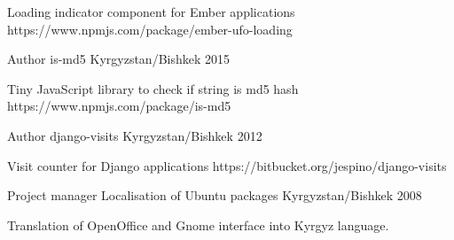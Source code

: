 \begin{cventries}
{\begin{cvitems}
        \item {Loading indicator component for Ember applications https://www.npmjs.com/package/ember-ufo-loading}
      \end{cvitems}
    }
  \cventry
    {Author}
    {is-md5}
    {Kyrgyzstan/Bishkek}
    {2015}
    {
      \begin{cvitems}
        \item {Tiny JavaScript library to check if string is md5 hash https://www.npmjs.com/package/is-md5}
      \end{cvitems}
    }
  \cventry
    {Author}
    {django-visits}
    {Kyrgyzstan/Bishkek}
    {2012}
    {
      \begin{cvitems}
        \item {Visit counter for Django applications https://bitbucket.org/jespino/django-visits}
      \end{cvitems}
    }
  \cventry
    {Project manager}
    {Localisation of Ubuntu packages}
    {Kyrgyzstan/Bishkek}
    {2008}
    {
      \begin{cvitems}
        \item {Translation of OpenOffice and Gnome interface into Kyrgyz language.}
      \end{cvitems}
    }
\end{cventries}
